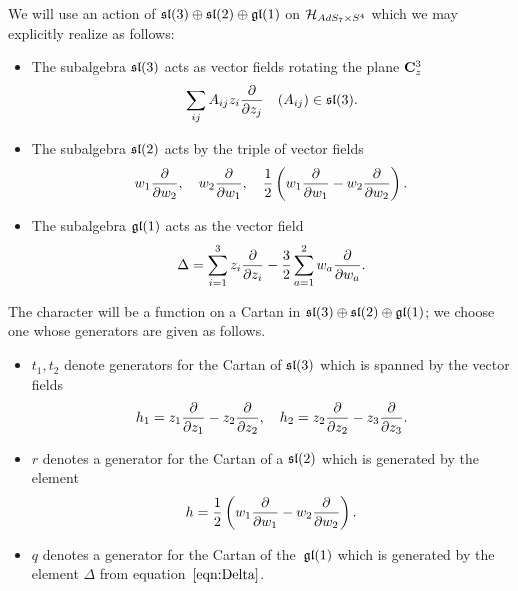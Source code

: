 \documentclass[../main.tex]{subfiles}
\begin{document}
We will use an action of $\mathfrak{sl}(3)\oplus \mathfrak{sl}(2)\oplus \mathfrak{gl}(1)$ on $\mathcal{H}_{AdS_7\times S^4}$ which we may explicitly realize as follows:
\begin{itemize}\label{eqn:im5}
\item
The subalgebra $\mathfrak{sl}(3)$ acts as vector fields rotating the plane $\mathbf{C}^3_z$
\begin{equation}
\sum_{ij} A_{ij} z_i \frac{\partial}{\partial z_j} \quad (A_{ij}) \in \mathfrak{sl}(3) .
\end{equation}
\item 
The subalgebra $\mathfrak{sl}(2)$ acts by the triple of vector fields
\begin{equation}
 w_1 \frac{\partial}{\partial w_2}, \quad w_2 \frac{\partial}{\partial w_1}, \quad \frac{1}{2}\left (w_1\frac{\partial}{\partial w_1}-w_2\frac{\partial}{\partial w_2}\right).
\end{equation}
\item The subalgebra $\mathfrak{gl}(1)$ acts as the vector field
\begin{equation}\label{eqn:Delta}
        \Delta = \sum_{i=1}^3 z_i\frac{\partial}{\partial z_i} - \frac 32\sum_{a=1}^2 w_a\frac{\partial}{\partial w_a}.
\end{equation}
\end{itemize}


The character will be a function on a Cartan in $\mathfrak{sl}(3)\oplus \mathfrak{sl}(2)\oplus \mathfrak{gl}(1)$; we choose one whose generators are given as follows. 
\begin{itemize}
  \item $t_{1}, t_{2}$ denote generators for the Cartan of $\mathfrak{sl}(3)$ which is spanned by the vector fields
  \begin{equation}
  h_1 = z_1 \frac{\partial}{\partial {z_1}} - z_2 \frac{\partial}{\partial{z_2}} , \quad h_2 = z_2 \frac{\partial}{\partial{z_2}} - z_3 \frac{\partial}{\partial{z_3}}.
  \end{equation}
  \item $r$ denotes a generator for the Cartan of a $\mathfrak{sl}(2)$ which is generated by the element 
  \begin{equation}
  \label{eqn:hCartan}
  h = \frac12 \left(w_1 \frac{\partial}{\partial w_1} - w_2 \frac{\partial}{\partial w_2}\right) .
  \end{equation}
\item $q$ denotes a generator for the Cartan of the~$\mathfrak{gl}(1)$ which is generated by the element $\Delta$ from equation~$\eqref{eqn:Delta}$. 
\end{itemize}
\end{document}
